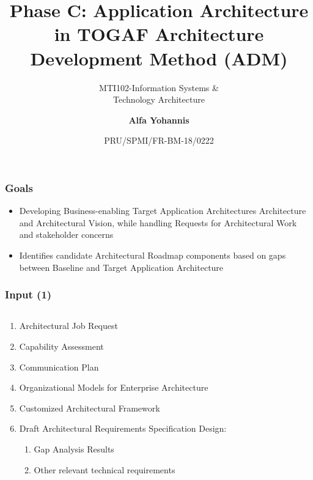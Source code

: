 \documentclass[aspectratio=169, table]{beamer}
\subtitle{MTI102-Information Systems \&\\Technology Architecture}
\title{\Large Phase C: Application Architecture\\in TOGAF
    Architecture\\Development Method (ADM)}
\date[Serial]{\scriptsize {PRU/SPMI/FR-BM-18/0222}}
\author[Pradita]{\small {\textbf{Alfa Yohannis}}}
\begin{document}
    \frame{\titlepage}

    \begin{frame}
        \frametitle{Goals}
        \begin{itemize}
            \item Developing Business-enabling Target Application Architectures
            Architecture and Architectural Vision, while handling Requests
            for Architectural Work and stakeholder concerns
            \item Identifies candidate Architectural Roadmap components based on gaps
            between Baseline and Target Application Architecture
        \end{itemize}
    \end{frame}

    \begin{frame}
        \frametitle{Input (1)}
        \vspace{20pt}
        \begin{columns}
            \begin{column}{0.5\textwidth}
                \begin{center}
                    \begin{enumerate}
                        \item Architectural Job Request
                        \item Capability Assessment
                        \item Communication Plan
                        \item Organizational Models for Enterprise Architecture
                        \item Customized Architectural Framework
                        \item Draft Architectural Requirements Specification Design:
                        \begin{enumerate}
                            \item Gap Analysis Results
                            \item Other relevant technical requirements
                        \end{enumerate}
                    \end{enumerate}
                \end{center}
            \end{column}


\end{columns}
\end{frame}
\end{document}
